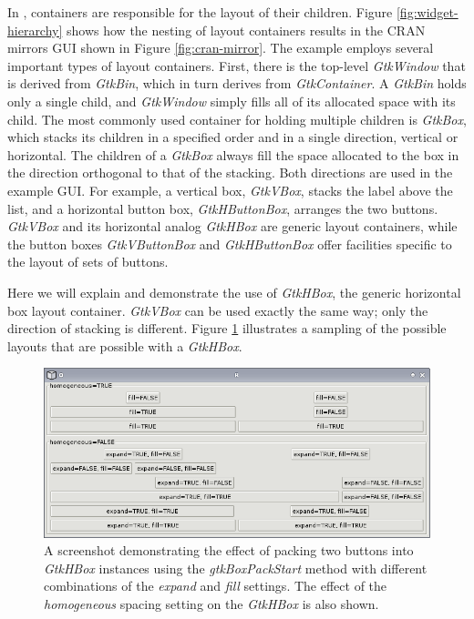 \documentclass[article]{jss}
\begin{document}
In , containers are responsible for the layout
of their children. Figure \ref{fig:widget-hierarchy} shows how the nesting of 
layout containers results in the CRAN mirrors GUI shown in Figure 
\ref{fig:cran-mirror}. The example employs several important types of 
layout containers. First, there is the top-level \emph{GtkWindow} that
is derived from \emph{GtkBin}, which in turn derives from \emph{GtkContainer}.
A \emph{GtkBin} holds only a single child, and \emph{GtkWindow} simply fills all
of its allocated space with its child. The most commonly used container
for holding multiple children is \emph{GtkBox}, which stacks its children
in a specified order and in a single direction, vertical or horizontal. The 
children of a \emph{GtkBox} always fill the space allocated to the box in 
the direction orthogonal to that of the stacking. Both
directions are used in the example GUI. For example, a vertical box, \emph{GtkVBox},
stacks the label above the list, and a horizontal button box, \emph{GtkHButtonBox},
arranges the two buttons. \emph{GtkVBox} and its horizontal analog \emph{GtkHBox}
are generic layout containers, while the button boxes \emph{GtkVButtonBox} and 
\emph{GtkHButtonBox} offer facilities specific to the layout of sets of buttons.

Here we will explain and demonstrate the use of \emph{GtkHBox}, the generic
horizontal box layout container. \emph{GtkVBox} can be used exactly the same way;
only the direction of stacking is different. Figure \ref{fig:packing} illustrates
a sampling of the possible layouts that are possible with a \emph{GtkHBox}.

\begin{figure}
\begin{center}
\includegraphics{packing.png}
\caption{\label{fig:packing}A screenshot demonstrating the effect of packing two
buttons into \emph{GtkHBox} instances using the \emph{gtkBoxPackStart} method 
with different combinations of the \emph{expand} and \emph{fill} settings. 
The effect of the \emph{homogeneous} spacing setting on the \emph{GtkHBox} is 
also shown.}
\end{center}
\end{figure}
\end{document}
